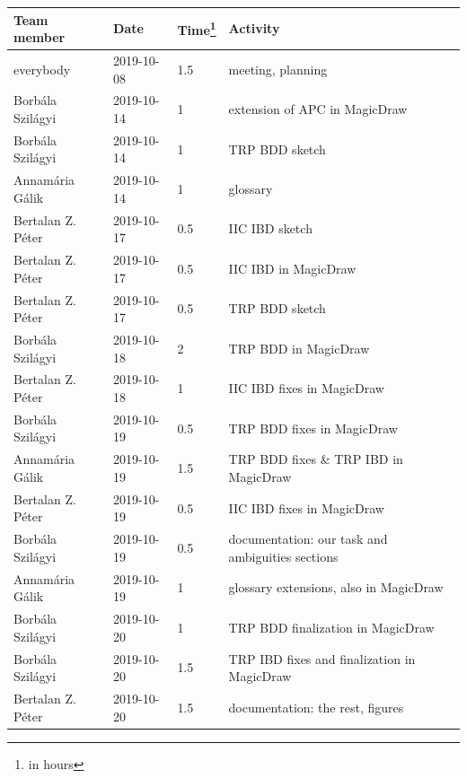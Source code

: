\documentclass[a4paper]{article}
\begin{document}
\begin{tabularx}{\textwidth}{l l l X}
	\toprule
	Team member & Date & Time\footnote{in hours} & Activity \\ \midrule

	everybody         & 2019-10-08 & 1.5 & meeting, planning              \\
	Borbála Szilágyi  & 2019-10-14 & 1   & extension of APC in MagicDraw  \\
	Borbála Szilágyi  & 2019-10-14 & 1   & TRP BDD sketch                 \\
	Annamária Gálik   & 2019-10-14 & 1   & glossary                       \\
	Bertalan Z. Péter & 2019-10-17 & 0.5 & IIC IBD sketch                 \\
	Bertalan Z. Péter & 2019-10-17 & 0.5 & IIC IBD in MagicDraw           \\
	Bertalan Z. Péter & 2019-10-17 & 0.5 & TRP BDD sketch                 \\
	Borbála Szilágyi  & 2019-10-18 & 2   & TRP BDD in MagicDraw           \\
	Bertalan Z. Péter & 2019-10-18 & 1   & IIC IBD fixes in MagicDraw     \\
	Borbála Szilágyi  & 2019-10-19 & 0.5 & TRP BDD fixes in MagicDraw     \\
	Annamária Gálik   & 2019-10-19 & 1.5 & TRP BDD fixes \& TRP IBD in
	                                       MagicDraw                      \\
	Bertalan Z. Péter & 2019-10-19 & 0.5 & IIC IBD fixes in MagicDraw     \\
	Borbála Szilágyi  & 2019-10-19 & 0.5 & documentation: our task and
	                                       ambiguities sections           \\
	Annamária Gálik   & 2019-10-19 & 1   & glossary extensions, also in
	                                       MagicDraw                      \\
	Borbála Szilágyi  & 2019-10-20 & 1   & TRP BDD finalization in
	                                       MagicDraw                      \\
	Borbála Szilágyi  & 2019-10-20 & 1.5 & TRP IBD fixes and finalization
	                                       in MagicDraw                   \\
	Bertalan Z. Péter & 2019-10-20 & 1.5 & documentation: the rest,
	                                       figures                        \\
	\bottomrule
\end{tabularx}

\clearpage
\glsaddall
\printglossaries
\end{document}
